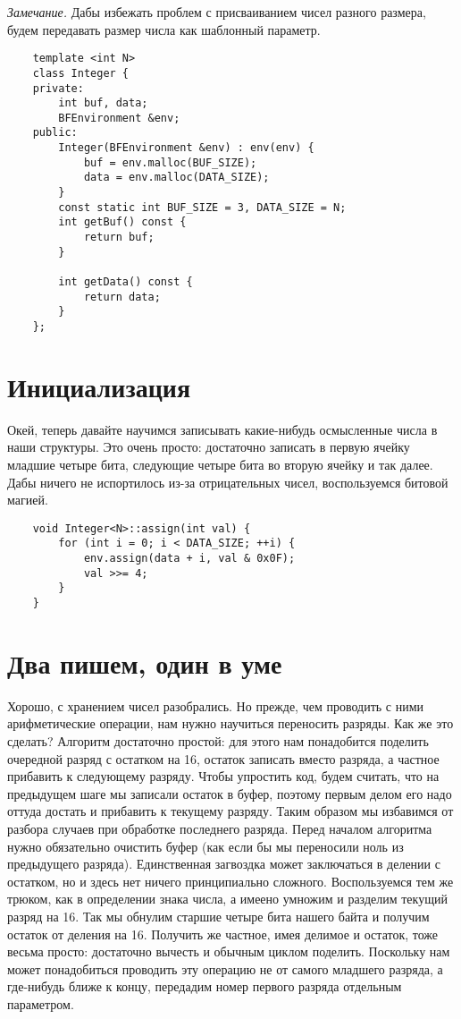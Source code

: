 \documentclass{book}
\begin{document}
{\em Замечание.} Дабы избежать проблем с присваиванием чисел разного размера, будем передавать размер числа как шаблонный параметр.

\begin{verbatim}
    template <int N>
    class Integer {
    private:
        int buf, data;
        BFEnvironment &env;
    public:
        Integer(BFEnvironment &env) : env(env) {
            buf = env.malloc(BUF_SIZE);
            data = env.malloc(DATA_SIZE);
        }
        const static int BUF_SIZE = 3, DATA_SIZE = N;
        int getBuf() const {
            return buf;
        }

        int getData() const {
            return data;
        }
    };
\end{verbatim}

\section{Инициализация}

Окей, теперь давайте научимся записывать какие-нибудь осмысленные числа в наши структуры. Это очень просто: достаточно записать в
первую ячейку младшие четыре бита, следующие четыре бита во вторую ячейку и так далее. Дабы ничего не испортилось из-за отрицательных
чисел, воспользуемся битовой магией.

\begin{verbatim}
    void Integer<N>::assign(int val) {
        for (int i = 0; i < DATA_SIZE; ++i) {
            env.assign(data + i, val & 0x0F);
            val >>= 4;
        }
    }
\end{verbatim}

\section{Два пишем, один в уме}

Хорошо, с хранением чисел разобрались. Но прежде, чем проводить с ними арифметические операции, нам нужно научиться переносить разряды. 
Как же это сделать? Алгоритм достаточно простой: для этого нам понадобится поделить очередной разряд с остатком на 16, остаток записать
вместо разряда, а частное прибавить к следующему разряду. Чтобы упростить код, будем считать, что на предыдущем шаге мы записали остаток
в буфер, поэтому первым делом его надо оттуда достать и прибавить к текущему разряду. Таким образом мы избавимся от разбора случаев при
обработке последнего разряда. Перед началом алгоритма нужно обязательно очистить буфер (как если бы мы переносили ноль из предыдущего
разряда). Единственная загвоздка может заключаться в делении с остатком, но и здесь нет ничего принципиально сложного. Воспользуемся тем
же трюком, как в определении знака числа, а имеено умножим и разделим текущий разряд на 16. Так мы обнулим старшие четыре бита нашего
байта и получим остаток от деления на 16. Получить же частное, имея делимое и остаток, тоже весьма просто: достаточно вычесть и обычным
циклом поделить. Поскольку нам может понадобиться проводить эту операцию не от самого младшего разряда, а где-нибудь ближе к концу, передадим
номер первого разряда отдельным параметром.
\end{document}
